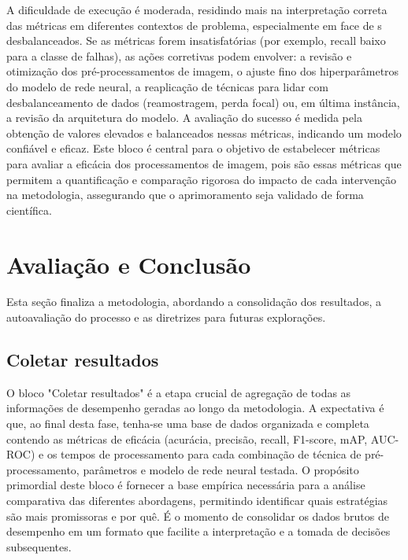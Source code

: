 A dificuldade de execução é moderada, residindo mais na interpretação correta das métricas em diferentes contextos de problema, especialmente em face de s desbalanceados. Se as métricas forem insatisfatórias (por exemplo, recall baixo para a classe de falhas), as ações corretivas podem envolver: a revisão e otimização dos pré-processamentos de imagem, o ajuste fino dos hiperparâmetros do modelo de rede neural, a reaplicação de técnicas para lidar com desbalanceamento de dados (reamostragem, perda focal) ou, em última instância, a revisão da arquitetura do modelo. A avaliação do sucesso é medida pela obtenção de valores elevados e balanceados nessas métricas, indicando um modelo confiável e eficaz. Este bloco é central para o objetivo de estabelecer métricas para avaliar a eficácia dos processamentos de imagem, pois são essas métricas que permitem a quantificação e comparação rigorosa do impacto de cada intervenção na metodologia, assegurando que o aprimoramento seja validado de forma científica.

\section{Avaliação e Conclusão}

Esta seção finaliza a metodologia, abordando a consolidação dos resultados, a autoavaliação do processo e as diretrizes para futuras explorações.

\subsection{Coletar resultados}
O bloco "Coletar resultados" é a etapa crucial de agregação de todas as informações de desempenho geradas ao longo da metodologia. A expectativa é que, ao final desta fase, tenha-se uma base de dados organizada e completa contendo as métricas de eficácia (acurácia, precisão, recall, F1-score, mAP, AUC-ROC) e os tempos de processamento para cada combinação de técnica de pré-processamento, parâmetros e modelo de rede neural testada. O propósito primordial deste bloco é fornecer a base empírica necessária para a análise comparativa das diferentes abordagens, permitindo identificar quais estratégias são mais promissoras e por quê. É o momento de consolidar os dados brutos de desempenho em um formato que facilite a interpretação e a tomada de decisões subsequentes.

